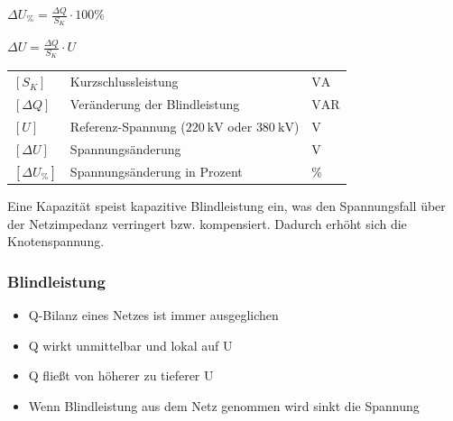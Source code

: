     \begin{minipage}[t]{0.35\columnwidth}
    \centering \vspace{-0.1\baselineskip}
        $\boxed{\Delta U_{\%} = \frac{\Delta Q}{S_K} \cdot 100\%}$
        
        $\boxed{\Delta U = \frac{\Delta Q}{S_K} \cdot U}$
    \end{minipage}%
    \hfill
    \begin{minipage}[t]{0.64\columnwidth}
    \centering \vspace{-0.1\baselineskip}
        \renewcommand{\arraystretch}{1.2}
        \begin{tabular}{@{} l p{4cm} l @{}}
            $[S_K]$  & Kurzschlussleistung \dotfill               & $\text{VA}$ \\
            $[\Delta Q]$ & Veränderung der Blindleistung \dotfill & $\text{VAR}$ \\
            $[U]$ & Referenz-Spannung ($\mathrm{220 \ kV}$ oder $\mathrm{380 \ kV}$) \dotfill & $\mathrm{V}$ \\
            $[\Delta U]$ & Spannungsänderung \dotfill & $\mathrm{V}$ \\
            $[\Delta U_{\%}]$ & Spannungsänderung in Prozent \dotfill & $\%$ \\
        \end{tabular}
    \end{minipage}

    Eine Kapazität speist kapazitive Blindleistung ein, 
    was den Spannungsfall über der Netzimpedanz verringert bzw. 
    kompensiert. Dadurch erhöht sich die Knotenspannung.

\subsubsection{Blindleistung}
    \begin{minipage}[t]{0.49\columnwidth}
        \begin{itemize}
            \item Q-Bilanz eines Netzes ist immer ausgeglichen
            \item Q wirkt unmittelbar und lokal auf U
        \end{itemize}
    \end{minipage}%
    \hfill
    \begin{minipage}[t]{0.49\columnwidth}
        \begin{itemize}
            \item Q fließt von höherer zu tieferer U
            \item Wenn Blindleistung aus dem Netz genommen wird sinkt die Spannung
        \end{itemize}
    \end{minipage}

